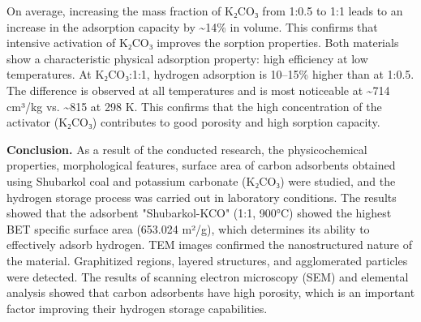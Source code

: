 
On average, increasing the mass fraction of K₂CO₃ from 1:0.5 to 1:1
leads to an increase in the adsorption capacity by \textasciitilde14\%
in volume. This confirms that intensive activation of K₂CO₃ improves the
sorption properties. Both materials show a characteristic physical
adsorption property: high efficiency at low temperatures. At K₂CO₃:1:1,
hydrogen adsorption is 10--15\% higher than at 1:0.5. The difference is
observed at all temperatures and is most noticeable at
\textasciitilde714 cm³/kg vs. \textasciitilde815 at 298 K. This confirms
that the high concentration of the activator (K₂CO₃) contributes to good
porosity and high sorption capacity.

{\bfseries Conclusion.} As a result of the conducted research, the
physicochemical properties, morphological features, surface area of
\hspace{0pt}\hspace{0pt}carbon adsorbents obtained using Shubarkol coal
and potassium carbonate (K₂CO₃) were studied, and the hydrogen storage
process was carried out in laboratory conditions. The results showed
that the adsorbent "Shubarkol-KCO"
(1:1, 900°C) showed the highest BET specific surface area (653.024
m²/g), which determines its ability to effectively adsorb hydrogen. TEM
images confirmed the nanostructured nature of the material. Graphitized
regions, layered structures, and agglomerated particles were detected.
The results of scanning electron microscopy (SEM) and elemental analysis
showed that carbon adsorbents have high porosity, which is an important
factor improving their hydrogen storage capabilities.

